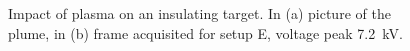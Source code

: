 \begin{figure}
 \centering
 \hfill
 \caption{Impact of plasma on an insulating target. In (a) picture of the plume, in (b) frame acquisited for setup E, voltage peak \SI{7.2}{\kilo\volt}.}
 \label{fig:elio_ins}
\end{figure}


